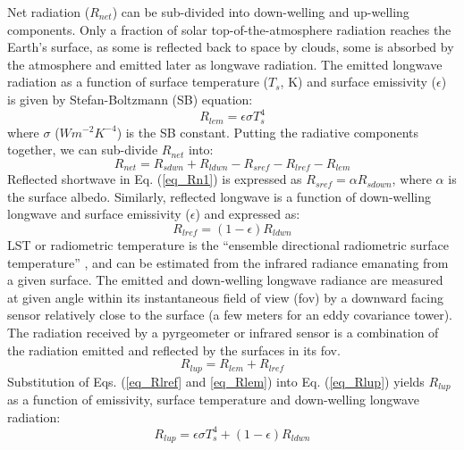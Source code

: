 \documentclass[fleqn,10pt]{wlscirep}
\begin{document}
Net radiation ($R_{net}$) can be sub-divided into down-welling and up-welling components. Only a fraction of solar top-of-the-atmosphere radiation reaches the Earth's surface, as some is reflected back to space by clouds, some is absorbed by the atmosphere and emitted later as longwave radiation. The emitted longwave radiation as a function of surface temperature ($T_s$, K) and surface emissivity ($\epsilon$) is given by Stefan-Boltzmann (SB) equation:
\begin{equation}\label{eq_Rlem}
R_{lem}= \epsilon \sigma T_{s}^{4}
\end{equation}
where $\sigma$ ($Wm^{-2}K^{-4}$) is the SB constant. 
Putting the radiative components together, we can sub-divide $R_{net}$ into:
\begin{equation}\label{eq_Rn1}
R_{net} = R_{sdwn} + R_{ldwn} - R_{sref} - R_{lref} - R_{lem}
\end{equation}
Reflected shortwave in Eq. ({\ref{eq_Rn1}}) is expressed as $R_{sref} = \alpha R_{sdown}$, where $\alpha$ is the surface albedo. Similarly, reflected longwave is a function of down-welling longwave and surface emissivity ($\epsilon$) and expressed as:
\begin{equation}\label{eq_Rlref}
R_{lref} = (1 - \epsilon) R_{ldwn} 
\end{equation}
LST or radiometric temperature is the “ensemble directional radiometric surface temperature” \cite{norman1995terminology}, and can be estimated from the infrared radiance emanating from a given surface\cite{kustas2007utility}. The emitted and down-welling longwave radiance are measured at given angle within its instantaneous field of view (fov) by a downward facing sensor relatively close to the surface (a few meters for an eddy covariance tower). The radiation received by a pyrgeometer or infrared sensor is a combination of the radiation emitted and reflected by the surfaces in its fov. 
\begin{equation}\label{eq_Rlup}
R_{lup} = R_{lem} + R_{lref}
\end{equation}
Substitution of Eqs. (\ref{eq_Rlref} and \ref{eq_Rlem}) into Eq. (\ref{eq_Rlup}) yields $R_{lup}$ as a function of emissivity, surface temperature and down-welling longwave radiation:
\begin{equation}\label{eq_leq}
R_{lup}= \epsilon \sigma T_{s}^{4} + (1- \epsilon)R_{ldwn}
\end{equation}
\end{document}
